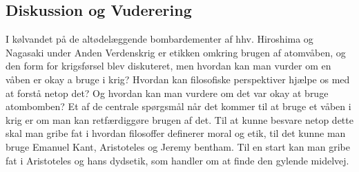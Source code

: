 \subsection{Diskussion og Vuderering}
I kølvandet på de altødelæggende bombardementer af hhv. Hiroshima og Nagasaki under Anden Verdenskrig er etikken omkring brugen af atomvåben, og den form for krigsførsel blev diskuteret, men hvordan kan man vurder om en våben er okay a bruge i krig? Hvordan kan filosofiske perspektiver hjælpe os med at forstå netop det? Og hvordan kan man vurdere om det var okay at bruge atombomben? Et af de centrale spørgsmål når det kommer til at bruge et våben i krig er om man kan retfærdiggøre brugen af det. Til at kunne besvare netop dette skal man gribe fat i hvordan filosoffer definerer moral og etik, til det kunne man bruge Emanuel Kant, Aristoteles og Jeremy bentham. Til en start kan man gribe fat i Aristoteles og hans dydsetik, som handler om at finde den gylende midelvej. \\

